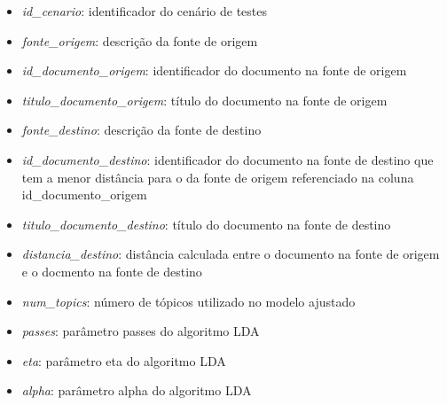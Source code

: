 \begin{itemize}
    \item \textit{id\_cenario}: identificador do cenário de testes
    \item \textit{fonte\_origem}: descrição da fonte de origem
    \item \textit{id\_documento\_origem}: identificador do documento na fonte de origem
    \item \textit{titulo\_documento\_origem}: título do documento na fonte de origem
    \item \textit{fonte\_destino}: descrição da fonte de destino
    \item \textit{id\_documento\_destino}: identificador do documento na fonte de destino que tem a menor distância para o da fonte de origem referenciado na coluna id\_documento\_origem
    \item \textit{titulo\_documento\_destino}: título do documento na fonte de destino
    \item \textit{distancia\_destino}: distância calculada entre o documento na fonte de origem e o docmento na fonte de destino
    \item \textit{num\_topics}: número de tópicos utilizado no modelo ajustado
    \item \textit{passes}: parâmetro passes do algoritmo LDA
    \item \textit{eta}: parâmetro eta do algoritmo LDA
    \item \textit{alpha}: parâmetro alpha do algoritmo LDA
\end{itemize}

\vspace{3mm} %


